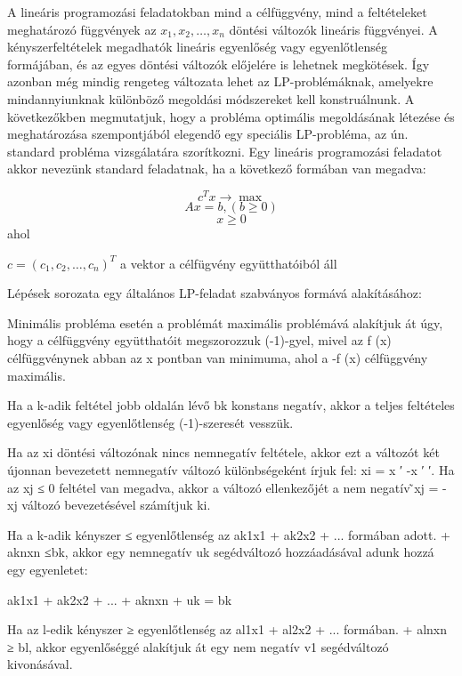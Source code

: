 

	
	
	A lineáris programozási feladatokban mind a célfüggvény, mind a feltételeket meghatározó függvények az $x_1, x_2,\ldots ,x_n$ döntési változók lineáris függvényei. A kényszerfeltételek megadhatók lineáris egyenlőség vagy egyenlőtlenség formájában, és az egyes döntési változók előjelére is lehetnek megkötések. Így azonban még mindig rengeteg változata lehet az LP-problémáknak, amelyekre mindannyiunknak különböző megoldási módszereket kell konstruálnunk. A következőkben megmutatjuk, hogy a probléma optimális megoldásának létezése és meghatározása szempontjából elegendő egy speciális LP-probléma, az ún. standard probléma vizsgálatára szorítkozni. Egy lineáris programozási feladatot akkor nevezünk standard feladatnak, ha a következő formában van megadva: 
	
$$c^Tx \rightarrow \max$$
$$Ax=b, (b\geq0)$$
$$x \geq0$$	
ahol

$c=(c_1,c_2,\ldots,c_n)^T$ a vektor a célfügvény együtthatóiból áll



Lépések sorozata egy általános LP-feladat szabványos formává alakításához:

Minimális probléma esetén a problémát maximális problémává alakítjuk át úgy, hogy a célfüggvény együtthatóit megszorozzuk (-1)-gyel, mivel az f (x) célfüggvénynek abban az x pontban van minimuma, ahol a -f (x) célfüggvény maximális. 

Ha a k-adik feltétel jobb oldalán lévő bk konstans negatív, akkor a teljes feltételes egyenlőség vagy egyenlőtlenség (-1)-szeresét vesszük. 

Ha az xi döntési változónak nincs nemnegatív feltétele, akkor ezt a változót két újonnan bevezetett nemnegatív változó különbségeként írjuk fel: xi = x ′ -x ′ ′.
Ha az xj ≤ 0 feltétel van megadva, akkor a változó ellenkezőjét a nem negatív ̃xj = -xj változó bevezetésével számítjuk ki. 

Ha a k-adik kényszer ≤ egyenlőtlenség az ak1x1 + ak2x2 + ... formában adott. + aknxn ≤bk, akkor egy nemnegatív uk segédváltozó hozzáadásával adunk hozzá egy egyenletet: 

ak1x1 + ak2x2 + ... + aknxn + uk = bk

Ha az l-edik kényszer ≥ egyenlőtlenség az al1x1 + al2x2 + ... formában. + alnxn ≥ bl, akkor egyenlőséggé alakítjuk át egy nem negatív v1 segédváltozó kivonásával. 


